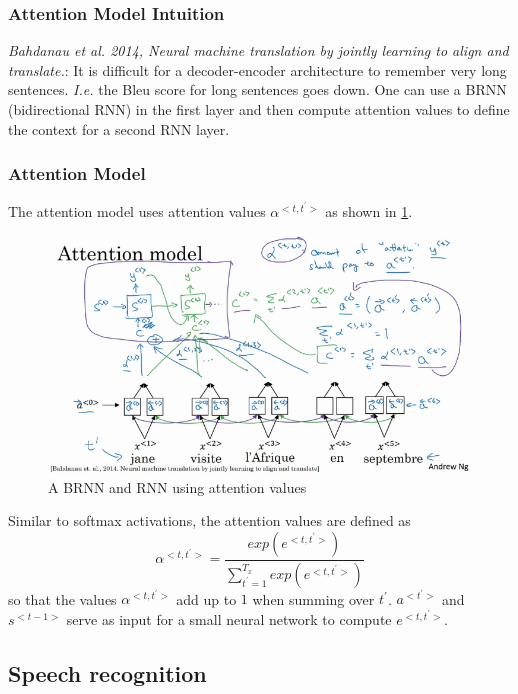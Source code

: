\documentclass{article}
\begin{document}
\subsubsection{Attention Model Intuition}
\emph{Bahdanau et al. 2014, Neural machine translation by jointly learning to align and translate.}:
It is difficult for a decoder-encoder architecture to remember very long sentences.
\emph{I.e.} the Bleu score for long sentences goes down.
One can use a BRNN (bidirectional RNN) in the first layer and then compute attention values to define the context for a second RNN layer.

\subsubsection{Attention Model}
The attention model uses attention values $\alpha^{<t,t^\prime>}$ as shown in \cref{fig:attention}.
\begin{figure}[htbp]
  \begin{center}
    \includegraphics[width=\textwidth]{attention}
    \caption{A BRNN and RNN using attention values}
    \label{fig:attention}
  \end{center}
\end{figure}
Similar to softmax activations, the attention values are defined as
\begin{equation}
  \alpha^{<t,t^\prime>}=\frac{exp(e^{<t,t^\prime>})}{\sum_{t^\prime=1}^{T_x}exp(e^{<t,t^\prime>})}
\end{equation}
so that the values $\alpha^{<t,t^\prime>}$ add up to $1$ when summing over $t^\prime$.
$a^{<t^\prime>}$ and $s^{<t-1>}$ serve as input for a small neural network to compute $e^{<t,t^\prime>}$.

\subsection{Speech recognition}
\end{document}
